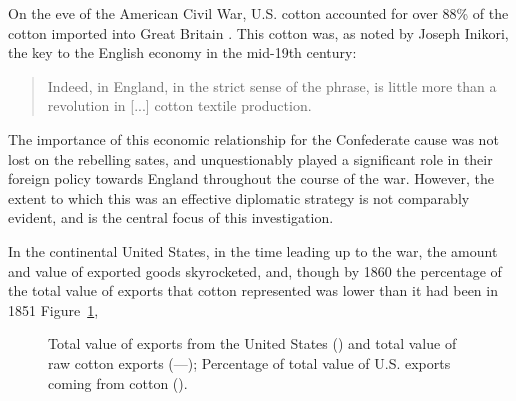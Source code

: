 
On the eve of the American Civil War, U.S. cotton accounted for over 88\% of the cotton imported into Great Britain \autocite[40]{baileyOtherSide1994}. This 
cotton was, as noted by Joseph Inikori, the key to the English economy in the mid-19th century: 
\begin{quote}
    Indeed,  in England, in the strict sense of the phrase, is little more than a revolution in [...] cotton textile production.
    \autocite[Joseph Inikori, {The Slave Trade and Revolution in Cotton Textile Production in England}, quoted in][40]{baileyOtherSide1994}
\end{quote}
The importance of this economic relationship for the Confederate cause was not lost on the rebelling sates, and unquestionably played a significant role in their 
foreign policy towards England throughout the course of the war. However, the extent to which this was an effective diplomatic strategy is not comparably evident,
and is the central focus of this investigation. 

In the continental United States, in the time leading up to the war, the amount and value of exported goods skyrocketed, and, though by 1860 the percentage of 
the total value of exports that cotton represented was lower than it had been in 1851 Figure~\ref{fig: 2.1}, 

\begin{figure}[ht]
    \centering
    
    \caption{
        Total value of exports from the United States\autocite[Table A-III]{northeconomicgrowth1966} (\textemdash) 
        and total value of raw cotton exports\autocite[Part 2, Table 2]{u.s.congressImportsduties1884} (---);
        Percentage of total value of U.S. exports coming from cotton (\textcolor{red!75!black}{\textemdash}).
    }
    \label{fig: 2.1}
\end{figure}